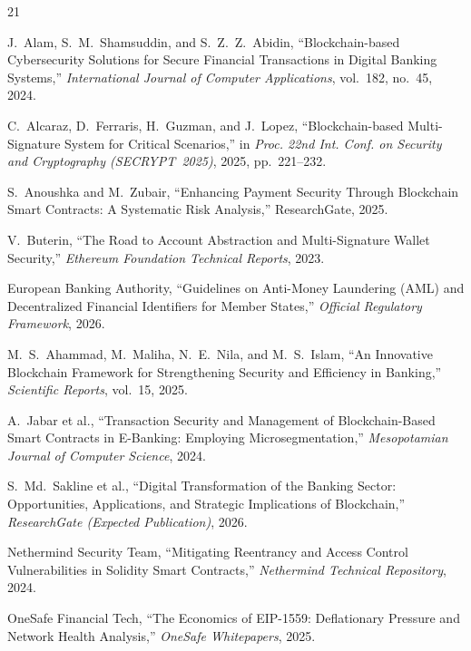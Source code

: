 \documentclass[conference]{IEEEtran}
\begin{document}
\begin{thebibliography}{21}

J.~Alam, S.~M.~Shamsuddin, and S.~Z.~Z.~Abidin,
``Blockchain-based Cybersecurity Solutions for Secure Financial Transactions in
Digital Banking Systems,''
\textit{International Journal of Computer Applications}, vol.~182, no.~45,
2024.

C.~Alcaraz, D.~Ferraris, H.~Guzman, and J.~Lopez,
``Blockchain-based Multi-Signature System for Critical Scenarios,''
in \textit{Proc. 22nd Int. Conf. on Security and Cryptography (SECRYPT~2025)},
2025, pp.~221--232.

S.~Anoushka and M.~Zubair,
``Enhancing Payment Security Through Blockchain Smart Contracts: A Systematic
Risk Analysis,''
ResearchGate, 2025.

V.~Buterin,
``The Road to Account Abstraction and Multi-Signature Wallet Security,''
\textit{Ethereum Foundation Technical Reports}, 2023.

European Banking Authority,
``Guidelines on Anti-Money Laundering (AML) and Decentralized Financial
Identifiers for Member States,''
\textit{Official Regulatory Framework}, 2026.

M.~S.~Ahammad, M.~Maliha, N.~E.~Nila, and M.~S.~Islam,
``An Innovative Blockchain Framework for Strengthening Security and Efficiency
in Banking,''
\textit{Scientific Reports}, vol.~15, 2025.

A.~Jabar et al.,
``Transaction Security and Management of Blockchain-Based Smart Contracts in
E-Banking: Employing Microsegmentation,''
\textit{Mesopotamian Journal of Computer Science}, 2024.

S.~Md.~Sakline et al.,
``Digital Transformation of the Banking Sector: Opportunities, Applications,
and Strategic Implications of Blockchain,''
\textit{ResearchGate (Expected Publication)}, 2026.

Nethermind Security Team,
``Mitigating Reentrancy and Access Control Vulnerabilities in Solidity Smart
Contracts,''
\textit{Nethermind Technical Repository}, 2024.

OneSafe Financial Tech,
``The Economics of EIP-1559: Deflationary Pressure and Network Health
Analysis,''
\textit{OneSafe Whitepapers}, 2025.


\end{thebibliography}
\end{document}
